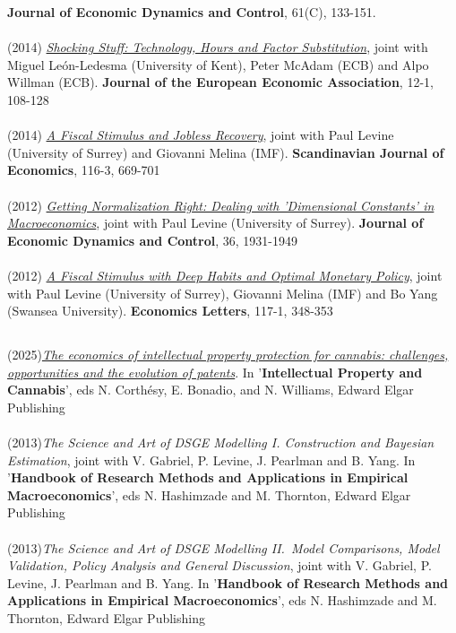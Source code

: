 \documentclass[margin, 11pt]{res} %
\begin{document}
\begin{resume}
\textbf{Journal of Economic Dynamics and Control}, 61(C), 133-151.\\
\\
(2014) \emph{\href{http://onlinelibrary.wiley.com/doi/10.1111/jeea.12038/abstract}{Shocking Stuff: Technology, Hours and Factor Substitution}}, joint with Miguel Le\'{o}n-Ledesma (University of Kent), Peter McAdam (ECB) and Alpo Willman (ECB). 
\textbf{Journal of the European Economic Association}, 12-1, 108-128\\
\\
(2014) \emph{\href{http://onlinelibrary.wiley.com/doi/10.1111/sjoe.12066/abstract}{A Fiscal Stimulus and Jobless Recovery}}, joint with  Paul Levine (University of Surrey) and Giovanni Melina (IMF). \textbf{Scandinavian Journal of Economics}, 116-3, 669-701\\
\\
(2012) \emph{\href{http://www.sciencedirect.com/science/article/pii/S0165188912001339}{Getting Normalization Right: Dealing with 'Dimensional Constants' in Macroeconomics}}, joint with Paul Levine (University of Surrey). \textbf{Journal of Economic Dynamics and Control},  36, 1931-1949\\
\\
(2012) \emph{\href{http://www.sciencedirect.com/science/article/pii/S0165176512003199}{A Fiscal Stimulus with Deep Habits and Optimal Monetary Policy}}, joint with  Paul Levine (University of Surrey), Giovanni Melina (IMF) and Bo Yang (Swansea University). \textbf{Economics Letters}, 117-1, 348-353

\subsection{}
(2025)\emph{\href{https://www.elgaronline.com/edcollchap/book/9781035329397/chapter13.xml}{The economics of intellectual property protection for cannabis: challenges, opportunities and the evolution of patents}}.  In  '\textbf{Intellectual Property and Cannabis}', eds N. Corthésy, E. Bonadio, and N. Williams,  Edward Elgar Publishing\\
\\
(2013)\emph{The Science and  Art of DSGE Modelling I. Construction and Bayesian Estimation}, joint with V. Gabriel,  P. Levine, J. Pearlman and B. Yang.   In  '\textbf{Handbook of Research Methods and Applications in Empirical Macroeconomics}', eds N. Hashimzade and M. Thornton,  Edward Elgar Publishing\\
\\
(2013)\emph{The Science and  Art of DSGE Modelling  II.~Model Comparisons, Model Validation, Policy Analysis and General Discussion}, joint with V. Gabriel,  P. Levine, J. Pearlman and B. Yang. In  '\textbf{Handbook of Research Methods and Applications in Empirical Macroeconomics}', eds N. Hashimzade and M. Thornton,  Edward Elgar Publishing



\end{resume}
\end{document}
